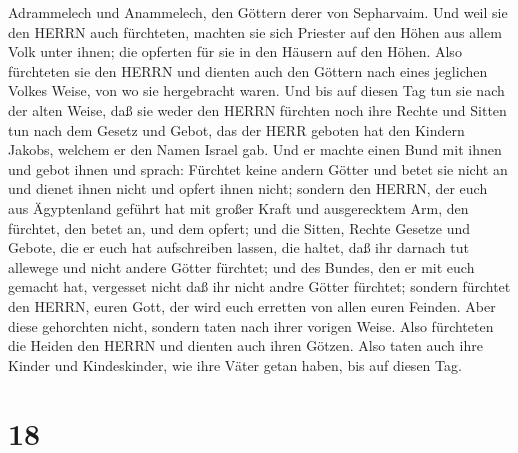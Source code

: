 Adrammelech und Anammelech, den Göttern derer von Sepharvaim.
 Und weil sie den HERRN auch fürchteten, machten sie sich
Priester auf den Höhen aus allem Volk unter ihnen; die opferten für sie
in den Häusern auf den Höhen.  Also fürchteten sie den
HERRN und dienten auch den Göttern nach eines jeglichen Volkes Weise,
von wo sie hergebracht waren.  Und bis auf diesen Tag tun
sie nach der alten Weise, daß sie weder den HERRN fürchten noch ihre
Rechte und Sitten tun nach dem Gesetz und Gebot, das der HERR geboten
hat den Kindern Jakobs, welchem er den Namen Israel gab. 
Und er machte einen Bund mit ihnen und gebot ihnen und sprach: Fürchtet
keine andern Götter und betet sie nicht an und dienet ihnen nicht und
opfert ihnen nicht;  sondern den HERRN, der euch aus
Ägyptenland geführt hat mit großer Kraft und ausgerecktem Arm, den
fürchtet, den betet an, und dem opfert;  und die Sitten,
Rechte Gesetze und Gebote, die er euch hat aufschreiben lassen, die
haltet, daß ihr darnach tut allewege und nicht andere Götter fürchtet;
 und des Bundes, den er mit euch gemacht hat, vergesset
nicht daß ihr nicht andre Götter fürchtet;  sondern
fürchtet den HERRN, euren Gott, der wird euch erretten von allen euren
Feinden.  Aber diese gehorchten nicht, sondern taten nach
ihrer vorigen Weise.  Also fürchteten die Heiden den HERRN
und dienten auch ihren Götzen. Also taten auch ihre Kinder und
Kindeskinder, wie ihre Väter getan haben, bis auf diesen Tag.

\hypertarget{section-17}{%
\section{18}\label{section-17}}

